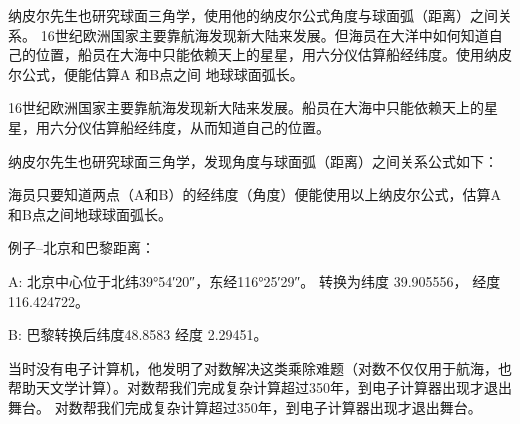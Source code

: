 纳皮尔先生也研究球面三角学，使用他的纳皮尔公式角度与球面弧（距离）之间关系。
16世纪欧洲国家主要靠航海发现新大陆来发展。但海员在大洋中如何知道自己的位置，船员在大海中只能依赖天上的星星，用六分仪估算船经纬度。使用纳皮尔公式，便能估算A
和B点之间 地球球面弧长。



16世纪欧洲国家主要靠航海发现新大陆来发展。船员在大海中只能依赖天上的星星，用六分仪估算船经纬度，从而知道自己的位置。

纳皮尔先生也研究球面三角学，发现角度与球面弧（距离）之间关系公式如下：


海员只要知道两点（A和B）的经纬度（角度）便能使用以上纳皮尔公式，估算A和B点之间地球球面弧长。

例子--北京和巴黎距离：

\begin{description}
\tightlist
\item[]
A: 北京中心位于北纬39°54′20″，东经116°25′29″。 转换为纬度 39.905556， 经度
116.424722。

B: 巴黎转换后纬度48.8583 经度 2.29451。
\end{description}

当时没有电子计算机，他发明了对数解决这类乘除难题（对数不仅仅用于航海，也帮助天文学计算）。对数帮我们完成复杂计算超过350年，到电子计算器出现才退出舞台。
对数帮我们完成复杂计算超过350年，到电子计算器出现才退出舞台。

